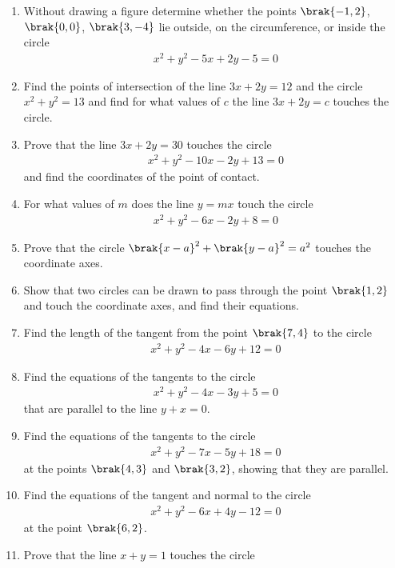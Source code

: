 \begin{enumerate}[1.]
\item Without drawing a figure determine whether the points $\brak{-1,2}$, $\brak{0,0}$, $\brak{3,-4}$ lie outside, on the circumference, or inside the circle
\begin{align*}
x^2+y^2-5x+2y-5 = 0
\end{align*}
\item Find the points of intersection of the line $3x+2y=12$ and the circle $x^2+y^2=13$ and find for what values of $c$ the line $3x+2y=c$ touches the circle.
\item Prove that the line $3x+2y=30$ touches the circle
\begin{align*}
x^2+y^2-10x-2y+13 = 0
\end{align*}
and find the coordinates of the point of contact.
\item For what values of $m$ does the line $y=mx$ touch the circle
\begin{align*}
x^2+y^2-6x-2y+8 = 0
\end{align*}
\item Prove that the circle $\brak{x-a}^2+\brak{y-a}^2=a^2$ touches the coordinate axes.
\item Show that two circles can be drawn to pass through the point $\brak{1,2}$ and touch the coordinate axes, and find their equations.
\item Find the length of the tangent from the point $\brak{7,4}$ to the circle 
\begin{align*}
x^2+y^2-4x-6y+12 = 0
\end{align*}
\item  Find the equations of the tangents to the circle
\begin{align*}
x^2+y^2 -4x -3y+5 = 0
\end{align*}
that are parallel to the line $y+x=0$.
\item Find the equations of the tangents to the circle
\begin{align*}
x^2+y^2-7x-5y+18=0
\end{align*}
at the points $\brak{4,3}$ and $\brak{3,2}$, showing that they are parallel.
\item Find the equations of the tangent and normal to the circle
\begin{align*}
x^2+y^2-6x+4y-12=0
\end{align*}
at the point $\brak{6,2}$.
\item Prove that the line $x+y=1$ touches the circle
\begin{align*}

\end{align*}
\end{enumerate}
